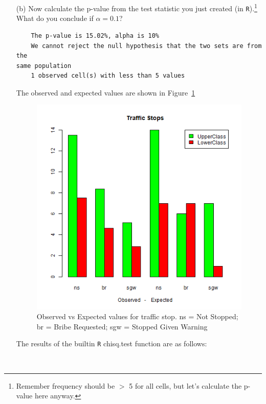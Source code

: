 \documentclass[12pt,letterpaper]{article}
\begin{document}
\begin{enumerate}
	  

	\item [(b)]
	Now calculate the p-value from the test statistic you just created (in \texttt{R}).\footnote{Remember frequency should be $>$ 5 for all cells, but let's calculate the p-value here anyway.}  What do you conclude if $\alpha = 0.1$?\\
	
	  
	
	\begin{verbatim}
	The p-value is 15.02%, alpha is 10%
	We cannot reject the null hypothesis that the two sets are from the
same population
	1 observed cell(s) with less than 5 values
	\end{verbatim}

  The observed and expected values are shown in Figure~\ref{fig:obs_exp}	
	\begin{figure}
		  \includegraphics{graphics/obs_exp.png}
		  \caption{Observed vs Expected values for traffic stop. ns = Not Stopped; br = Bribe Requested; sgw = Stopped Given Warning}\label{fig:obs_exp}
	\end{figure}

  The results of the builtin \texttt{R} chisq.test function are as follows:
  \begin{verbatim}
  

\end{verbatim}
\end{enumerate}
\end{document}
